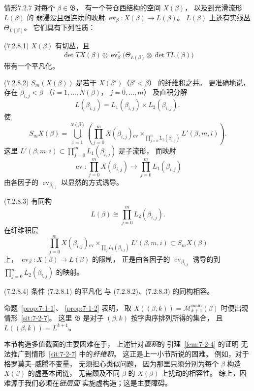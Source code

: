\begin{statement}{情形}{7.2.7}\label{sit:7-2-7}
对每个 $\beta\in\mathfrak B$，
有一个带仓西结构的空间 $X(\beta)$，
以及到光滑流形 $L(\beta)$ 的
弱浸没且强连续的映射
$\operatorname{ev}_\beta\colon
X(\beta)\to L(\beta)$。
$L(\beta)$ 上还有实线丛
$\Theta_{L(\beta)}$。
它们具有下列性质：

\noindent\textup{(7.2.8.1)}\quad
$X(\beta)$ 有切丛，且
\[
\det TX(\beta)\otimes
\operatorname{ev}_\beta^*
\bigl(\Theta_{L(\beta)}\otimes
\det TL(\beta)\bigr)
\]
带有一个平凡化。

\noindent\textup{(7.2.8.2)}\quad
$S_m(X(\beta))$ 是若干
$X(\beta')$（$\beta'<\beta$）
的纤维积之并。
更准确地说，
存在
$\beta_{i,j}<\beta$
（$i=1,\ldots,N(\beta)$，
$j=0,\ldots,m$）
及直积分解
\begin{equation}
L(\beta_{i,j})
=L_1(\beta_{i,j})\times L_2(\beta_{i,j}),
\tag{7.2.9}\label{eq:7-2-9}
\end{equation}
使
\[
S_mX(\beta)
=\bigcup_{i=1}^{N(\beta)}
\left(
\prod_{j=0}^{m}X(\beta_{i,j})
{}_{\operatorname{ev}}\!\times_{\prod_{j=0}^{m}L_1(\beta_{i,j})}
L'(\beta,m,i)
\right).
\]
这里
$L'(\beta,m,i)\subset
\prod_{j=0}^{m}L_1(\beta_{i,j})$
是子流形，
而映射
\[
\operatorname{ev}\colon
\prod_{j=0}^{m}X(\beta_{i,j})
\longrightarrow
\prod_{j=0}^{m}L_1(\beta_{i,j})
\]
由各因子的
$\operatorname{ev}_{\beta_{i,j}}$
以显然的方式诱导。

\noindent\textup{(7.2.8.3)}\quad
有同构
\[
L(\beta)\cong
\prod_{j=0}^{m}L_2(\beta_{i,j}).
\]
在纤维积层
\[
\prod_{j=0}^{m}X(\beta_{i,j})
{}_{\operatorname{ev}}\!\times_{\prod_jL_1(\beta_{i,j})}
L'(\beta,m,i)
\subset S_mX(\beta)
\]
上，
$\operatorname{ev}_\beta\colon
X(\beta)\to L(\beta)$
的限制，
正是由各因子的
$\operatorname{ev}_{\beta_{i,j}}$
诱导的到
$\prod_{j=0}^{m}L_2(\beta_{i,j})$
的映射。

\noindent\textup{(7.2.8.4)}\quad
条件 (7.2.8.1) 的平凡化
与 (7.2.8.2)、(7.2.8.3)
的同构相容。
\end{statement}

命题~\ref{prop:7-1-1}、
\ref{prop:7-1-2} 表明，
取
$X((\beta,k))
=\mathcal M^{\mathrm{main}}_{k+1}(\beta)$
时便出现情形~\ref{sit:7-2-7}。
这里 $\mathfrak B$ 是对子 $(\beta,k)$
按字典序排列所得的集合，
且 $L((\beta,k))=L^{k+1}$。

本节构造多值截面的主要困难在于，
上述针对\emph{直积}的
引理~\ref{lem:7-2-4} 的证明
无法推广到情形~\ref{sit:7-2-7}
中的\emph{纤维积}。
这正是上一小节所说的困难。
例如，对于格罗莫夫--威腾不变量，
无须担心类似问题，
因为那里只须分别为每个 $\beta$
构造 $X(\beta)$ 的虚基本闭链，
无需顾及不同 $\beta$ 的
$X(\beta)$ 上扰动的相容性。
综上，困难源于我们必须在\emph{链层面}
实施虚构造；这是主要障碍。

